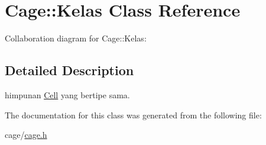 \hypertarget{classCage_1_1Kelas}{}\section{Cage\+:\+:Kelas Class Reference}
\label{classCage_1_1Kelas}


Collaboration diagram for Cage\+:\+:Kelas\+:


\subsection{Detailed Description}
himpunan \hyperlink{classCell}{Cell} yang bertipe sama. 

The documentation for this class was generated from the following file\+:\begin{DoxyCompactItemize}
\item 
cage/\hyperlink{cage_8h}{cage.\+h}\end{DoxyCompactItemize}

